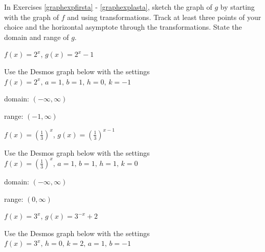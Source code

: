 \documentclass{ximera}
\begin{document}
	\author{Stitz-Zeager}



\label{ExercisesforExponentialFunctions}


\begin{question}
In Exercises \ref{graphexpfirsta} - \ref{graphexplasta}, sketch the graph of $g$ by starting with the graph of $f$ and using transformations.  Track at least three points of your choice and the horizontal asymptote through the transformations. State the domain and range of $g$.

\begin{problem}\label{graphexpfirsta}
$f(x) = 2^{x}$, $g(x) = 2^{x} - 1$

\begin{solution}
Use the Desmos graph below with the settings $f(x)=2^x,\,a=1,\,b=1,\,h=0,\,k=-1$

\begin{center} 
\end{center}

domain: $(-\infty, \infty)$

range: $(-1, \infty)$

\end{solution}
\end{problem}  

\begin{problem}
$f(x) = \left(\frac{1}{3}\right)^{x}$, $g(x) = \left(\frac{1}{3}\right)^{x-1}$

\begin{solution}
Use the Desmos graph below with the settings $f(x)=\left(\frac{1}{3}\right)^{x},\,a=1,\,b=1,\,h=1,\,k=0$

\begin{center} 
\end{center}

domain: $(-\infty, \infty)$

range: $(0, \infty)$

\end{solution}
\end{problem} 

\begin{problem}
$f(x) = 3^{x}$, $g(x) = 3^{-x}+2$

\begin{solution}
Use the Desmos graph below with the settings $f(x)=3^x,\,h=0,\,k=2,\,a=1,\,b=-1$


\end{solution}
\end{problem}
\end{question}
\end{document}
